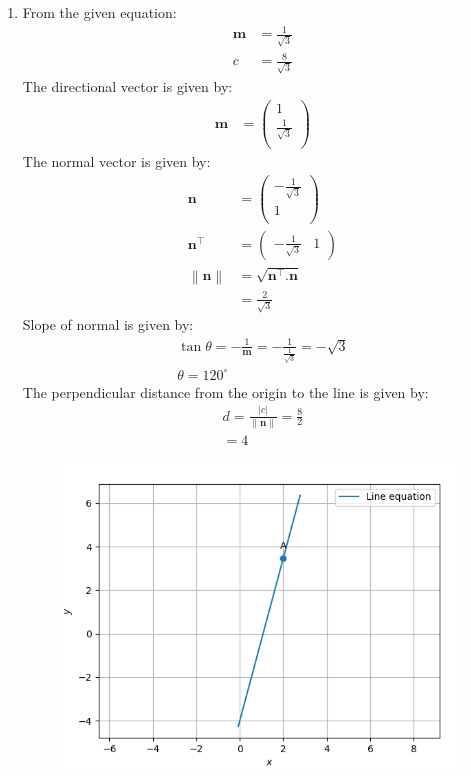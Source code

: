 \documentclass[12pt]{article}
\providecommand{\norm}[1]{\left\lVert#1\right\rVert}
\newcommand{\myvec}[1]{\ensuremath{\begin{pmatrix}#1\end{pmatrix}}}
\let\vec\mathbf
\begin{document}
\begin{enumerate}
\item From the given equation:
	\begin{align}
		\vec{m}&=\frac{1}{\sqrt{3}}\\
		c&=\frac{8}{\sqrt{3}}
	\end{align}
        The directional vector is given by:
	\begin{align}
		\vec{m}&=\myvec{1\\\frac{1}{\sqrt{3}}\\}
	\end{align}
	The normal vector is given by:
		\begin{align}
	\vec{n}&=\myvec{-\frac{1}{\sqrt{3}}\\1\\}\\
	\vec{n}^\top&=\myvec{-\frac{1}{\sqrt{3}} & 1}\\
			\norm{\vec{n}}&=\sqrt{\vec{n}^\top.\vec{n}}\\
			&=\frac{2}{\sqrt{3}}
			\end{align}
	Slope of normal is given by:
		\begin{align}
			\tan\theta=-\frac{1}{\vec{m}}=-\frac{1}{\frac{1}{\sqrt{3}}}=-\sqrt{3}\\
			\theta=120^\circ
		\end{align}
	The perpendicular distance from the origin to the line is given by:
		\begin{align}
			d=\frac{|c|}{\norm{\vec{n}}}=\frac{8}{2}\\
			=4
		\end{align}
\begin{figure}[!h]
	\begin{center} 
	    \includegraphics[width=\columnwidth]{./figs/line.png}
	\end{center}
\caption{}
\label{fig:Fig}
\end{figure}
	


\end{enumerate}
\end{document}
